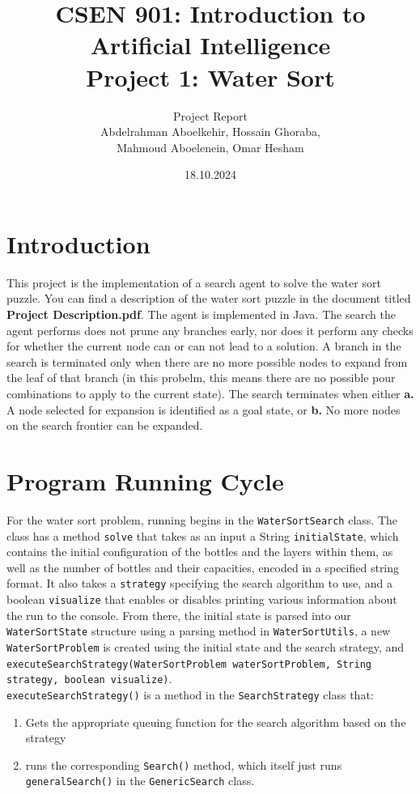 \documentclass{article}
\title{CSEN 901: Introduction to Artificial Intelligence \\Project 1: Water Sort}
\author{Project Report \vspace{24pt} \\ Abdelrahman Aboelkehir, Hossain Ghoraba, \\ Mahmoud Aboelenein, Omar Hesham}
\date{18.10.2024}
\begin{document}
\maketitle

\section{Introduction}
This project is the implementation of a search agent to solve the water sort puzzle. You can find a description of the water sort puzzle in the document titled \textbf{Project Description.pdf}. The agent is implemented in Java. The search the agent performs does not prune any branches early, nor does it perform any checks for whether the current node can or can not lead to a solution. A branch in the search is terminated only when there are no more possible nodes to expand from the leaf of that branch (in this probelm, this means there are no possible pour combinations to apply to the current state). The search terminates when either \textbf{a.} A node selected for expansion is identified as a goal state, or \textbf{b.} No more nodes on the search frontier can be expanded.


\section{Program Running Cycle}

For the water sort problem, running begins in the \texttt{WaterSortSearch} class. The class has a method \texttt{solve} that takes as an input a String \texttt{initialState}, which contains the initial configuration of the bottles and the layers within them, as well as the number of bottles and their capacities, encoded in a specified string format. It also takes a \texttt{strategy} specifying the search algorithm to use, and a boolean \texttt{visualize} that enables or disables printing various information about the run to the console. From there, the initial state is parsed into our \texttt{WaterSortState} structure using a parsing method in \texttt{WaterSortUtils}, a new \texttt{WaterSortProblem} is created using the initial state and the search strategy, and \texttt{executeSearchStrategy(WaterSortProblem waterSortProblem, String strategy, boolean visualize)}. \\

\texttt{executeSearchStrategy()} is a method in the \texttt{SearchStrategy} class that:

\begin{enumerate}
\item Gets the appropriate queuing function for the search algorithm based on the strategy
\item runs the corresponding \texttt{Search()} method, which itself just runs \texttt{generalSearch()} in the \texttt{GenericSearch} class.
\end{enumerate}
\end{document}
